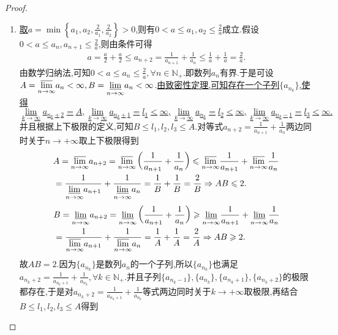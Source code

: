 \documentclass[../../main.tex]{subfiles}
\begin{document}
\begin{proof}
\begin{enumerate}
\item \hyperref[example3.24(1)]{取\(a=\min \left\{ a_1,a_2,\frac{2}{a_1},\frac{2}{a_2} \right\}>0\)},则有$0<a\leqslant  a_1,a_2\leqslant  \frac{2}{a}$成立.假设$0<a\leqslant  a_n,a_{n+1}\leqslant  \frac{2}{a}$,则由条件可得
\begin{align*}
a=\frac{a}{2}+\frac{a}{2}\leqslant a_{n+2}=\frac{1}{a_{n+1}}+\frac{1}{a_n}\leqslant \frac{1}{a}+\frac{1}{a}=\frac{2}{a}.
\end{align*}
由数学归纳法,可知$0<a\leqslant  a_n\leqslant  \frac{2}{a},\forall n\in\mathbb{N}_+$.即数列${a_n}$有界.于是可设$A=\underset{n\rightarrow \infty}{{\varlimsup }}a_n<\infty ,B=\underset{n\rightarrow \infty}{{\varliminf }}a_n<\infty$.\hyperref[example3.24(2)]{由致密性定理,可知存在一个子列$\{a_{n_k}\}$,使得$$\lim_{k\rightarrow \infty} a_{n_k+2}=A,\lim_{k\rightarrow \infty} a_{n_k+1}=l_1<\infty,\lim_{k\rightarrow \infty} a_{n_k}=l_2<\infty,\lim_{k\rightarrow \infty} a_{n_k-1}=l_3<\infty.$$}并且根据上下极限的定义,可知$B\leqslant  l_1,l_2,l_3\leqslant  A$.对等式$a_{n + 2} = \frac{1}{a_{n + 1}} + \frac{1}{a_{n}}$两边同时关于$n\to+\infty$取上下极限得到
\begin{align*}
&A=\underset{n\rightarrow \infty}{{\varlimsup }}a_{n+2}=\underset{n\rightarrow \infty}{{\varlimsup }}\left( \frac{1}{a_{n+1}}+\frac{1}{a_n} \right) \leqslant \underset{n\rightarrow \infty}{{\varlimsup }}\frac{1}{a_{n+1}}+\underset{n\rightarrow \infty}{{\varlimsup }}\frac{1}{a_n}
\\
&=\frac{1}{\underset{n\rightarrow \infty}{{\varliminf }}a_{n+1}}+\frac{1}{\underset{n\rightarrow \infty}{{\varliminf }}a_n}=\frac{1}{B}+\frac{1}{B}=\frac{2}{B}\Rightarrow AB\leqslant 2.
\end{align*}
\begin{align*}
&B=\underset{n\rightarrow \infty}{{\varliminf }}a_{n+2}=\underset{n\rightarrow \infty}{{\varliminf }}\left( \frac{1}{a_{n+1}}+\frac{1}{a_n} \right) \geqslant \underset{n\rightarrow \infty}{{\varliminf }}\frac{1}{a_{n+1}}+\underset{n\rightarrow \infty}{{\varliminf }}\frac{1}{a_n}
\\
&=\frac{1}{\underset{n\rightarrow \infty}{{\varlimsup }}a_{n+1}}+\frac{1}{\underset{n\rightarrow \infty}{{\varlimsup }}a_n}=\frac{1}{A}+\frac{1}{A}=\frac{2}{A}\Rightarrow AB\geqslant 2.
\end{align*}
故$AB=2$.因为$\{a_{n_k}\}$是数列${a_n}$的一个子列,所以$\{a_{n_k}\}$也满足$a_{n_k+2}=\frac{1}{a_{n_k+1}}+\frac{1}{a_{n_k}},\forall k\in\mathbb{N}_+$.并且子列$\{a_{n_k-1}\},\{a_{n_k}\},\{a_{n_k+1}\},\{a_{n_k+2}\}$的极限都存在,于是对$a_{n_k+2}=\frac{1}{a_{n_k+1}}+\frac{1}{a_{n_k}}$等式两边同时关于$k\to+\infty$取极限,再结合$B\leqslant  l_1,l_2,l_3\leqslant  A$得到

\end{enumerate}
\end{proof}
\end{document}
